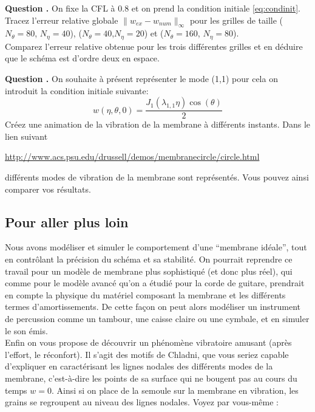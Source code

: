 \documentclass[a4,12pt]{article}
\newcounter{Nbquestion}
\newcommand*\question{%
\stepcounter{Nbquestion}%
\textbf{Question \theNbquestion. }}
\begin{document}

\begin{mdframed}[style=exampledefault]
\question On fixe la CFL à 0.8 et on prend la condition initiale \ref{eq:condinit}.\\
 Tracez l'erreur relative globale $\|w_{ex}-w_{num}\|_{\infty}$ pour les grilles de taille ($N_\theta=80$, $N_\eta=40$), ($N_\theta=40$,$N_\eta=20$) et ($N_\theta=160$, $N_\eta=80$).\\
Comparez l'erreur relative obtenue pour les trois différentes grilles et en déduire que le schéma est d'ordre deux en espace.
\end{mdframed}



\begin{mdframed}[style=exampledefault]
\question On souhaite à présent représenter le mode (1,1) pour cela on introduit la condition initiale suivante:
\[
w(\eta,\theta,0)=\dfrac{J_1(\lambda_{1,1}\eta)\cos(\theta)}{2}
\]
Créez une animation de la vibration de la membrane à différents instants.
Dans le lien suivant 
\begin{center}
	\url{http://www.acs.psu.edu/drussell/demos/membranecircle/circle.html}
\end{center} 
différents modes de vibration de la membrane sont représentés.
Vous pouvez ainsi comparer  vos résultats.
\end{mdframed}

\subsection{Pour aller plus loin}

Nous avons modéliser et simuler le comportement d'une \enquote{membrane idéale}, tout en contrôlant la précision du schéma et sa stabilité. On pourrait reprendre ce travail pour un modèle de membrane plus sophistiqué (et donc plus réel), qui comme pour le modèle avancé qu'on a étudié pour la corde de guitare, prendrait en compte la physique du matériel composant la membrane et les différents termes d'amortissements. De cette façon on peut alors modéliser un instrument de percussion comme un tambour, une caisse claire ou une cymbale, et en simuler le son émis. \\

Enfin on vous propose de découvrir un phénomène vibratoire amusant (après l'effort, le réconfort). Il s'agit des motifs de Chladni, que vous seriez capable d'expliquer en caractérisant les lignes nodales des différents modes de la membrane, c'est-à-dire les points de sa surface qui ne bougent pas au cours du temps $w=0$. Ainsi si on place de la semoule sur la membrane en vibration, les grains se regroupent au niveau des lignes nodales. Voyez par vous-même :
\end{document}
